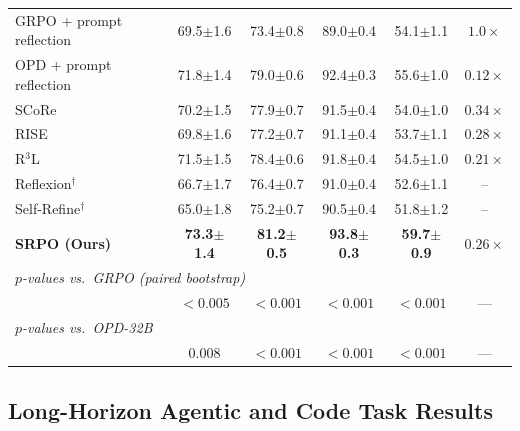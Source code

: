 \documentclass{article}
\newcommand{\method}{SRPO}
\theoremstyle{plain}
\theoremstyle{definition}
\theoremstyle{remark}
\begin{document}
\begin{table}[h]
\begin{tabular}{@{}lccccc@{}}
GRPO + prompt reflection      & 69.5$\pm$1.6 & 73.4$\pm$0.8 & 89.0$\pm$0.4 & 54.1$\pm$1.1 & $1.0\times$ \\
OPD + prompt reflection       & 71.8$\pm$1.4 & 79.0$\pm$0.6 & 92.4$\pm$0.3 & 55.6$\pm$1.0 & $0.12\times$ \\
\midrule
SCoRe~\cite{SCoRe}                       & 70.2$\pm$1.5 & 77.9$\pm$0.7 & 91.5$\pm$0.4 & 54.0$\pm$1.0 & $0.34\times$ \\
RISE~\cite{qu2024rise}                   & 69.8$\pm$1.6 & 77.2$\pm$0.7 & 91.1$\pm$0.4 & 53.7$\pm$1.1 & $0.28\times$ \\
R$^3$L~\cite{r3l2026}                    & 71.5$\pm$1.5 & 78.4$\pm$0.6 & 91.8$\pm$0.4 & 54.5$\pm$1.0 & $0.21\times$ \\
\midrule
Reflexion$^\dagger$           & 66.7$\pm$1.7 & 76.4$\pm$0.7 & 91.0$\pm$0.4 & 52.6$\pm$1.1 & -- \\
Self-Refine$^\dagger$         & 65.0$\pm$1.8 & 75.2$\pm$0.7 & 90.5$\pm$0.4 & 51.8$\pm$1.2 & -- \\
\midrule
\rowcolor{gray!15}
\textbf{\method{} (Ours)}     & \textbf{73.3$\pm$1.4} & \textbf{81.2$\pm$0.5} & \textbf{93.8$\pm$0.3} & \textbf{59.7$\pm$0.9} & $\mathbf{0.26\times}$ \\
\midrule
\multicolumn{6}{l}{\emph{$p$-values vs.\ GRPO (paired bootstrap)}} \\
& $<\!0.005$ & $<\!0.001$ & $<\!0.001$ & $<\!0.001$ & --- \\
\multicolumn{6}{l}{\emph{$p$-values vs.\ OPD-32B}} \\
& $0.008$ & $<\!0.001$ & $<\!0.001$ & $<\!0.001$ & --- \\
\bottomrule
\end{tabular}
\end{table}

\subsection{Long-Horizon Agentic and Code Task Results}
\end{document}
